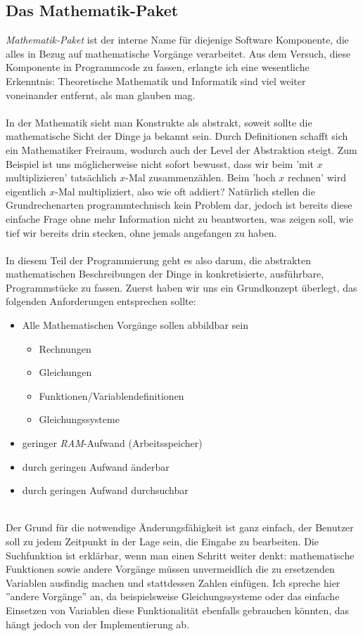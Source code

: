 \subsection{Das Mathematik-Paket}
\textit{Mathematik-Paket} ist der interne Name für diejenige Software Komponente, die alles in Bezug auf mathematische Vorgänge verarbeitet. Aus dem Versuch, diese Komponente in Programmcode zu fassen, erlangte ich eine wesentliche Erkenntnis: Theoretische Mathematik und Informatik sind viel weiter voneinander entfernt, als man glauben mag.\\\\
In der Mathematik sieht man Konstrukte als abstrakt, soweit sollte die mathematische Sicht der Dinge ja bekannt sein. Durch Definitionen schafft sich ein Mathematiker Freiraum, wodurch auch der Level der Abstraktion steigt. Zum Beispiel ist uns möglicherweise nicht sofort bewusst, dass wir beim 'mit $x$ multiplizieren' tatsächlich $x$-Mal zusammenzählen. Beim 'hoch $x$ rechnen' wird eigentlich $x$-Mal multipliziert, also wie oft addiert? Natürlich stellen die Grundrechenarten programmtechnisch kein Problem dar, jedoch ist bereits diese einfache Frage ohne mehr Information nicht zu beantworten, was zeigen soll, wie tief wir bereits drin stecken, ohne jemals angefangen zu haben.\\\\
In diesem Teil der Programmierung geht es also darum, die abstrakten mathematischen Beschreibungen der Dinge in konkretisierte, ausführbare, Programmstücke zu fassen. Zuerst haben wir uns ein Grundkonzept überlegt, das folgenden Anforderungen entsprechen sollte:\\
\begin{itemize}
	\item Alle Mathematischen Vorgänge sollen abbildbar sein
	\begin{itemize}
		\item Rechnungen
		\item Gleichungen
		\item Funktionen/Variablendefinitionen
		\item Gleichungssysteme
	\end{itemize}
	\item geringer \textit{RAM}-Aufwand (Arbeitsspeicher)
	\item durch geringen Aufwand änderbar
	\item durch geringen Aufwand durchsuchbar
\end{itemize}
\ \\
Der Grund für die notwendige Änderungsfähigkeit ist ganz einfach, der Benutzer soll zu jedem Zeitpunkt in der Lage sein, die Eingabe zu bearbeiten. Die Suchfunktion ist erklärbar, wenn man einen Schritt weiter denkt: mathematische Funktionen sowie andere Vorgänge müssen unvermeidlich die zu ersetzenden Variablen ausfindig machen und stattdessen Zahlen einfügen. Ich spreche hier ''andere Vorgänge'' an, da beispielsweise Gleichungssysteme oder das einfache Einsetzen von Variablen diese Funktionalität ebenfalls gebrauchen könnten, das hängt jedoch von der Implementierung ab.\\
